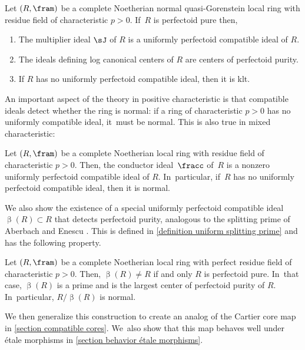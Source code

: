 \begin{mainthm}
Let $(R,\fram)$ be a complete Noetherian normal quasi-Gorenstein local ring with residue field of characteristic $p>0$. If~$R$ is perfectoid pure then,
\begin{enumerate}
\item The multiplier ideal $\sJ$ of $R$ is a uniformly perfectoid compatible ideal of $R$.
\item The ideals defining log canonical centers of $R$ are centers of perfectoid purity.
\item If $R$ has no uniformly perfectoid compatible ideal, then it is klt.
\end{enumerate}
\end{mainthm}

An important aspect of the theory in positive characteristic is that compatible ideals detect whether the ring is normal: if a ring of characteristic $p>0$ has no uniformly compatible ideal, it~must be normal. This is also true in mixed characteristic:

\begin{mainthm}
Let $(R,\fram)$ be a complete Noetherian local ring with residue field of characteristic $p>0$. Then, the conductor ideal~$\fracc$ of~$R$ is a nonzero uniformly perfectoid compatible ideal of $R$. In~particular, if~$R$ has no uniformly perfectoid compatible ideal, then it is normal.
\end{mainthm}

We also show the existence of a special uniformly perfectoid compatible ideal $\upbeta(R)\subset R$ that detects perfectoid purity, analogous to the splitting prime of Aberbach and Enescu \cite{AberbachEnescuStructureOfFPure}. This is defined in \autoref{definition uniform splitting prime} and has the following property.

\begin{mainthm}
Let $(R,\fram)$ be a complete Noetherian local ring with perfect residue field of characteristic $p>0$. Then, $\upbeta(R)\neq R$ if and only $R$ is perfectoid pure. In~that case, $\upbeta(R)$ is a prime and is the largest center of perfectoid purity of $R$. In~particular, $R/\upbeta(R)$ is normal.
\end{mainthm}

We then generalize this construction to create an analog of the Cartier core map \cite{BadillaCespedesFInvariantsSRRings,BrosowskyCartierCoreMap,CarvajalFayolleTameRamificationCFPS} in \autoref{section compatible cores}. We~also show that this map behaves well under étale morphisms in \autoref{section behavior étale morphisms}.

